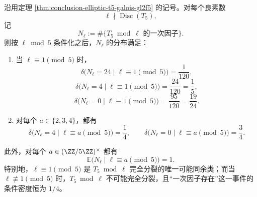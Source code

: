 \begin{theorem}\label{thm:conclusion-elliptic-t5-linear-factor-conditional-density-mod5}
沿用定理 \ref{thm:conclusion-elliptic-t5-galois-gl2f5} 的记号。对每个良素数
\[
\ell\nmid \operatorname{Disc}(T_5),
\]
记
\[
N_\ell:=\#\{\text{\(T_5\bmod \ell\) 的一次因子}\}.
\]
则按 \(\ell\bmod 5\) 条件化之后，\(N_\ell\) 的分布满足：
\begin{enumerate}
  \item 当 \(\ell\equiv 1\pmod 5\) 时，
  \[
  \delta\!\bigl(N_\ell=24\mid \ell\equiv 1\!\!\!\!\pmod 5\bigr)=\frac{1}{120},
  \]
  \[
  \delta\!\bigl(N_\ell=4\mid \ell\equiv 1\!\!\!\!\pmod 5\bigr)=\frac{24}{120}=\frac15,
  \]
  \[
  \delta\!\bigl(N_\ell=0\mid \ell\equiv 1\!\!\!\!\pmod 5\bigr)=\frac{95}{120}=\frac{19}{24}.
  \]
  \item 对每个 \(a\in\{2,3,4\}\)，都有
  \[
  \delta\!\bigl(N_\ell=4\mid \ell\equiv a\!\!\!\!\pmod 5\bigr)=\frac14,
  \qquad
  \delta\!\bigl(N_\ell=0\mid \ell\equiv a\!\!\!\!\pmod 5\bigr)=\frac34.
  \]
\end{enumerate}
此外，对每个 \(a\in(\ZZ/5\ZZ)^\times\) 都有
\[
\mathbb E\!\bigl(N_\ell\mid \ell\equiv a\!\!\!\!\pmod 5\bigr)=1.
\]
特别地，\(\ell\equiv 1\pmod 5\) 是 \(T_5\bmod \ell\) 完全分裂的唯一可能同余类；而当 \(\ell\not\equiv 1\pmod 5\) 时，\(T_5\bmod \ell\) 不可能完全分裂，且“一次因子存在”这一事件的条件密度恒为 \(1/4\)。
\end{theorem}
